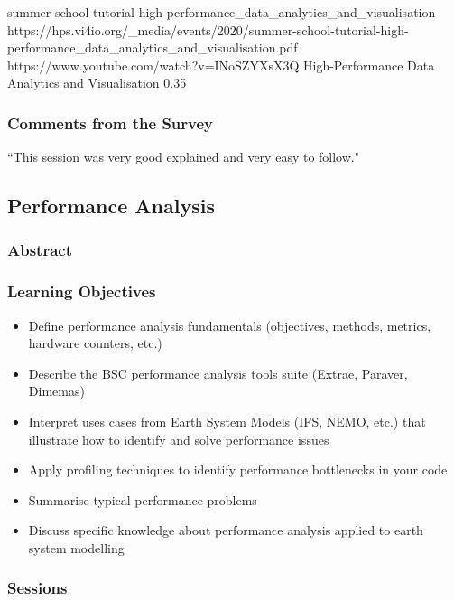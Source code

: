 \slidetable
{summer-school-tutorial-high-performance_data_analytics_and_visualisation}
{https://hps.vi4io.org/_media/events/2020/summer-school-tutorial-high-performance_data_analytics_and_visualisation.pdf}
{https://www.youtube.com/watch?v=INoSZYXsX3Q}
{High-Performance Data Analytics and Visualisation}
{0.35}

\subsubsection{Comments from the Survey}

``This session was very good explained and very easy to follow."

\subsection{Performance Analysis}
\label{sec:pa}

\subsubsection{Abstract}

\subsubsection{Learning Objectives}

\begin{itemize}

\item Define performance analysis fundamentals (objectives, methods, metrics, hardware counters, etc.)
\item Describe the BSC performance analysis tools suite (Extrae, Paraver, Dimemas)
\item Interpret uses cases from Earth System Models (IFS, NEMO, etc.) that illustrate how to identify and solve performance issues
\item Apply profiling techniques to identify performance bottlenecks in your code
\item Summarise typical performance problems
\item Discuss specific knowledge about performance analysis applied to earth system modelling

\end{itemize}

\subsubsection{Sessions}

